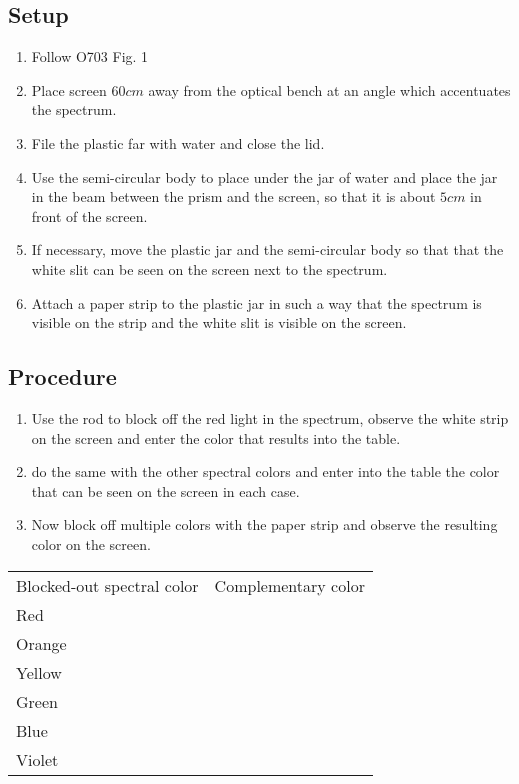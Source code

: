 \documentclass[12pt]{article}
\begin{document}
\subsection*{Setup}


\begin{enumerate}
\item Follow O703 Fig. 1
\item Place screen $60 cm $ away from the optical bench at an angle which accentuates the spectrum.
\item File the plastic far with water and close the lid.
\item Use the semi-circular body to place under the jar of water and place the jar in the beam between the prism and the screen, so that it is about $5cm$ in front of the screen.
\item If necessary, move the plastic jar and the semi-circular body so that that the white slit can be seen on the screen next to the spectrum.
\item Attach a paper strip to the plastic jar in such a way that the spectrum is visible on the strip and the white slit is visible on the screen.
\end{enumerate}

\subsection*{Procedure}

\begin{enumerate}
\item Use the rod to block off the red light in the spectrum, observe the white strip on the screen and enter the color that results into the table.
\item do the same with the other spectral colors and enter into the table the color that can be seen on the screen in each case.
\item Now block off multiple colors with the paper strip and observe the resulting color on the screen.
\end{enumerate}

\begin{table}[]
\begin{tabular}{ll}
 Blocked-out spectral color & Complementary color  \\
Red &  \\
Orange &  \\
Yellow &  \\
Green &  \\
Blue &  \\
Violet &  
\end{tabular}
\end{table}
\end{document}
